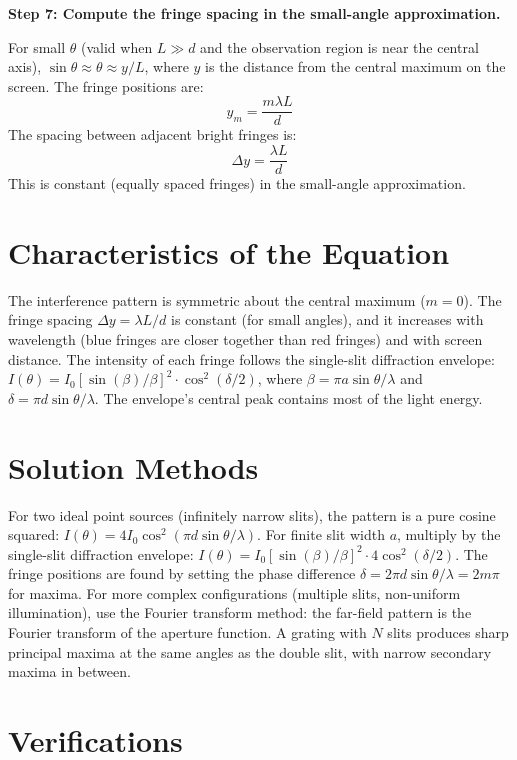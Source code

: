 \textbf{Step 7: Compute the fringe spacing in the small-angle approximation.}

For small $\theta$ (valid when $L \gg d$ and the observation region is near the central axis), $\sin\theta \approx \theta \approx y/L$, where $y$ is the distance from the central maximum on the screen. The fringe positions are:
\begin{equation}
y_m = \frac{m\lambda L}{d}
\end{equation}
The spacing between adjacent bright fringes is:
\begin{equation}
\Delta y = \frac{\lambda L}{d}
\end{equation}
This is constant (equally spaced fringes) in the small-angle approximation.

\section*{Characteristics of the Equation}

The interference pattern is symmetric about the central maximum ($m = 0$). The fringe spacing $\Delta y = \lambda L/d$ is constant (for small angles), and it increases with wavelength (blue fringes are closer together than red fringes) and with screen distance. The intensity of each fringe follows the single-slit diffraction envelope: $I(\theta) = I_0[\sin(\beta)/\beta]^2 \cdot \cos^2(\delta/2)$, where $\beta = \pi a\sin\theta/\lambda$ and $\delta = \pi d\sin\theta/\lambda$. The envelope's central peak contains most of the light energy.
\section*{Solution Methods}

For two ideal point sources (infinitely narrow slits), the pattern is a pure cosine squared: $I(\theta) = 4I_0\cos^2(\pi d\sin\theta/\lambda)$. For finite slit width $a$, multiply by the single-slit diffraction envelope: $I(\theta) = I_0[\sin(\beta)/\beta]^2 \cdot 4\cos^2(\delta/2)$. The fringe positions are found by setting the phase difference $\delta = 2\pi d\sin\theta/\lambda = 2m\pi$ for maxima. For more complex configurations (multiple slits, non-uniform illumination), use the Fourier transform method: the far-field pattern is the Fourier transform of the aperture function. A grating with $N$ slits produces sharp principal maxima at the same angles as the double slit, with narrow secondary maxima in between.
\section*{Verifications}

